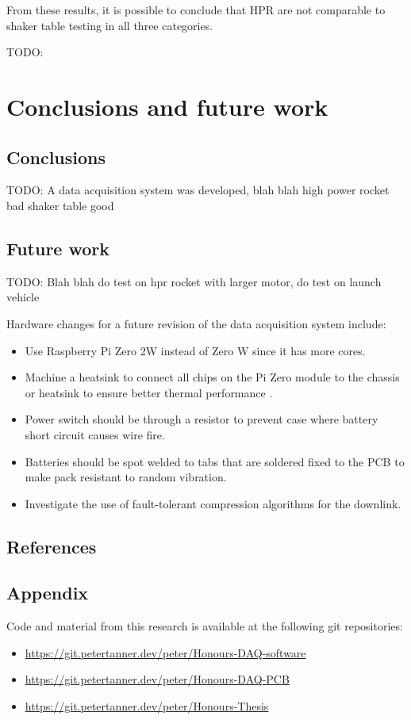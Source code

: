 \documentclass[]{report}
\begin{document}
From these results, it is possible to conclude that HPR are not comparable to shaker table testing in all three categories.

TODO:

\chapter{Conclusions and future work}

\section{Conclusions}

TODO: A data acquisition system was developed, blah blah high power rocket bad shaker table good

\section{Future work}

TODO: Blah blah do test on hpr rocket with larger motor, do test on launch vehicle

Hardware changes for a future revision of the data acquisition system include:

\begin{itemize}
  \item Use Raspberry Pi Zero 2W instead of Zero W since it has more cores.
  \item Machine a heatsink to connect all chips on the Pi Zero module to the chassis or heatsink to ensure better thermal performance \cite{guertin2022raspberry}.
  \item Power switch should be through a resistor to prevent case where battery short circuit causes wire fire.
  \item Batteries should be spot welded to tabs that are soldered fixed to the PCB to make pack resistant to random vibration.
  \item Investigate the use of fault-tolerant compression algorithms for the downlink. %
\end{itemize}

\newpage

\section{References}

\printbibliography[heading=none]

\section{Appendix}

Code and material from this research is available at the following git repositories:

\begin{itemize}
  \item \url{https://git.petertanner.dev/peter/Honours-DAQ-software}
  \item \url{https://git.petertanner.dev/peter/Honours-DAQ-PCB}
  \item \url{https://git.petertanner.dev/peter/Honours-Thesis}
\end{itemize}
\end{document}
